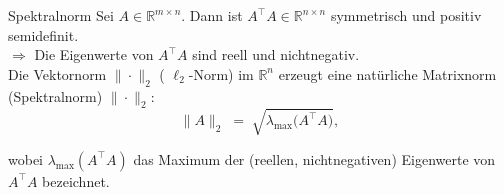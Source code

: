 \begin{lemma}{Spektralnorm}
    Sei $A\in\mathbb{R}^{m\times n}$. Dann ist $A^\top A\in\mathbb{R}^{n\times n}$ symmetrisch und positiv semidefinit.\\
    $\Rightarrow$ Die Eigenwerte von $A^\top A$ sind reell und nichtnegativ.\\[2ex]

    Die Vektornorm $\|\cdot\|_2$ ( $\ell_2$-Norm) im $\mathbb{R}^n$ erzeugt eine natürliche Matrixnorm (Spektralnorm) $\|\cdot\|_2$:\\[1ex]

    $$
    \|A\|_2 \;=\; \sqrt{\lambda_{\max}\!\bigl(A^\top A\bigr)},
    $$

    wobei $\lambda_{\max}(A^\top A)$ das Maximum der (reellen, nichtnegativen) Eigenwerte von $A^\top A$ bezeichnet.
\end{lemma}

